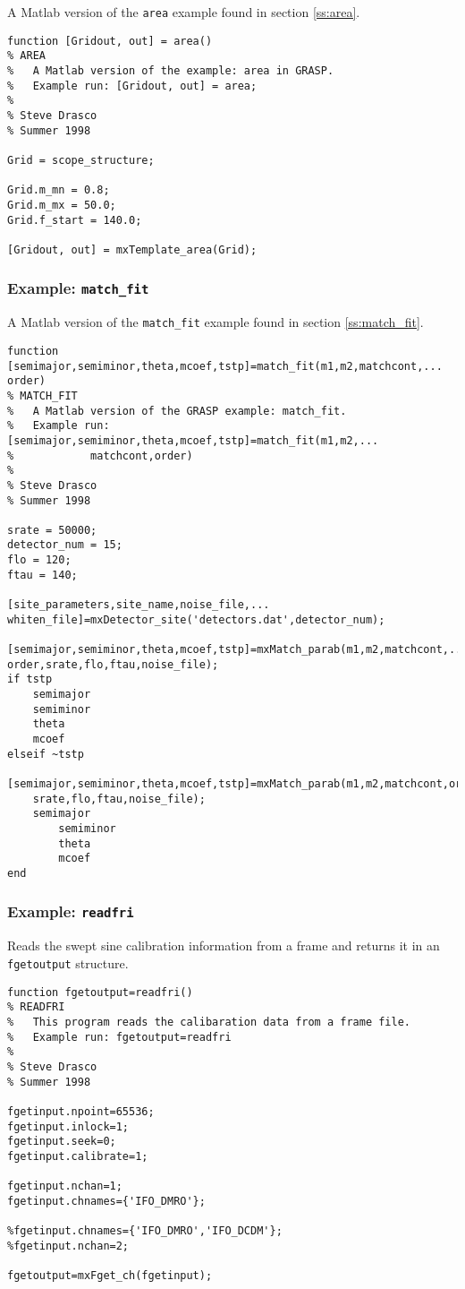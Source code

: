 A Matlab version of the \texttt{area} example found in section \ref{ss:area}.

\begin{verbatim}
function [Gridout, out] = area()
% AREA
%	A Matlab version of the example: area in GRASP.
%	Example run: [Gridout, out] = area;
%
% Steve Drasco
% Summer 1998

Grid = scope_structure;

Grid.m_mn = 0.8;
Grid.m_mx = 50.0;
Grid.f_start = 140.0;

[Gridout, out] = mxTemplate_area(Grid);
\end{verbatim}

\subsubsection{Example: {\tt match\_fit}}
\label{sss:match_fit}

A Matlab version of the \texttt{match\_fit} example found in section \ref{ss:match_fit}.

\begin{verbatim}
function [semimajor,semiminor,theta,mcoef,tstp]=match_fit(m1,m2,matchcont,...
order)
% MATCH_FIT
%	A Matlab version of the GRASP example: match_fit.
%	Example run: [semimajor,semiminor,theta,mcoef,tstp]=match_fit(m1,m2,...
%		     matchcont,order)
%
% Steve Drasco
% Summer 1998

srate = 50000;
detector_num = 15;
flo = 120;
ftau = 140;

[site_parameters,site_name,noise_file,...
whiten_file]=mxDetector_site('detectors.dat',detector_num);

[semimajor,semiminor,theta,mcoef,tstp]=mxMatch_parab(m1,m2,matchcont,...
order,srate,flo,ftau,noise_file);
if tstp
	semimajor
	semiminor
	theta
	mcoef
elseif ~tstp
	[semimajor,semiminor,theta,mcoef,tstp]=mxMatch_parab(m1,m2,matchcont,order,...
	srate,flo,ftau,noise_file);
	semimajor
        semiminor
        theta
        mcoef
end
\end{verbatim}

\subsubsection{Example: {\tt readfri}}
\label{sss:readfri}

Reads the swept sine calibration information from a frame and returns it in an
\texttt{fgetoutput} structure.

\begin{verbatim}
function fgetoutput=readfri()
% READFRI
%	This program reads the calibaration data from a frame file.
%	Example run: fgetoutput=readfri
%
% Steve Drasco
% Summer 1998

fgetinput.npoint=65536;
fgetinput.inlock=1;
fgetinput.seek=0;
fgetinput.calibrate=1;

fgetinput.nchan=1;
fgetinput.chnames={'IFO_DMRO'};

%fgetinput.chnames={'IFO_DMRO','IFO_DCDM'};
%fgetinput.nchan=2;

fgetoutput=mxFget_ch(fgetinput);
\end{verbatim}


